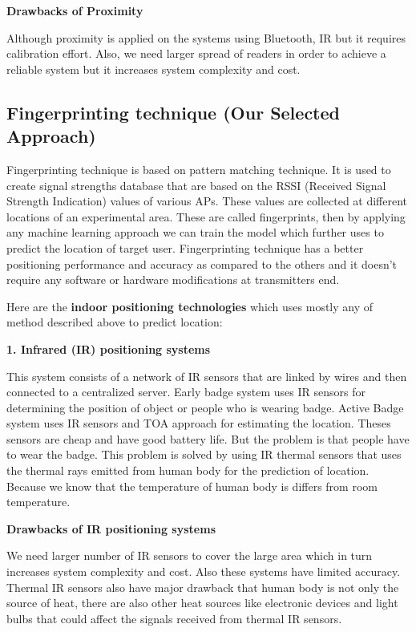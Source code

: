\textbf{Drawbacks of Proximity}

Although proximity is applied on the systems using Bluetooth, IR but it requires calibration effort\cite{Sakpere2017ASS}. Also, we need larger spread of readers in order to achieve a reliable system but it increases system complexity and cost.

\subsection{Fingerprinting technique (Our Selected Approach)}
Fingerprinting technique is based on pattern matching technique. It is used to create signal strengths database that are based on the RSSI (Received Signal Strength Indication) values of various APs. These values are collected at different locations of an experimental area. These are called fingerprints, then by applying any machine learning approach we can train the model which further uses to predict the location of target user. Fingerprinting technique has a better positioning performance and accuracy as compared to the others and it doesn’t require any software or hardware modifications at transmitters end.

Here are the \textbf{indoor positioning technologies} which uses mostly any of method described above to predict location:

\textbf{1. Infrared (IR) positioning systems}

This system consists of a network of IR sensors that are linked by wires and then connected to a centralized server. Early badge system uses IR sensors for determining the position of object or people who is wearing badge.  Active Badge system uses IR sensors and TOA approach for estimating the location. Theses sensors are cheap and have good battery life. But the problem is that people have to wear the badge. This problem is solved by using IR thermal sensors\cite{Sakpere2017ASS} that uses the thermal rays emitted from human body for the prediction of location. Because we know that the temperature of human body is differs from room temperature.

\textbf{Drawbacks of IR positioning systems}

We need larger number of IR sensors to cover the large area which in turn increases system complexity and cost. Also these systems have limited accuracy. Thermal IR sensors also have major drawback that human body is not only the source of heat, there are also other heat sources like electronic devices and light bulbs that could affect the signals received from thermal IR sensors.

